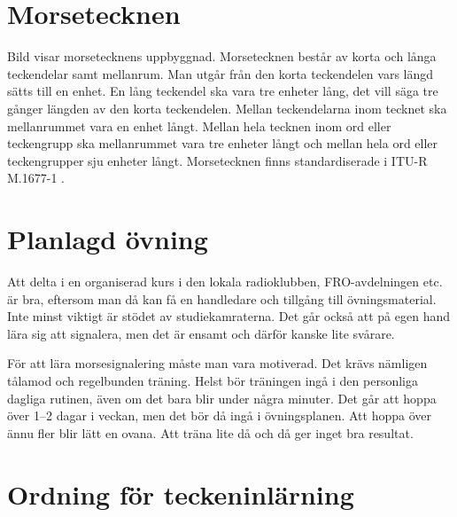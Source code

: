 \section{Morsetecknen}


Bild  visar morsetecknens uppbyggnad.
Morsetecknen består av korta och långa teckendelar samt mellanrum.
Man utgår från den korta teckendelen vars längd sätts till en enhet.
En lång teckendel ska vara tre enheter lång, det vill säga tre gånger längden
av den korta teckendelen.
Mellan teckendelarna inom tecknet ska mellanrummet vara en enhet långt.
Mellan hela tecknen inom ord eller teckengrupp ska mellanrummet vara
tre enheter långt och mellan hela ord eller teckengrupper sju enheter långt.
Morsetecknen finns standardiserade i ITU-R M.1677-1 \cite{M1677-1}.

\section{Planlagd övning}

Att delta i en organiserad kurs i den lokala radioklubben, FRO-avdelningen etc.
är bra, eftersom man då kan få en handledare och tillgång till övningsmaterial.
Inte minst viktigt är stödet av studiekamraterna.
Det går också att på egen hand lära sig att signalera, men det är ensamt och
därför kanske lite svårare.

För att lära morsesignalering måste man vara motiverad.
Det krävs nämligen tålamod och regelbunden träning.
Helst bör träningen ingå i den personliga dagliga rutinen, även om det bara
blir under några minuter.
Det går att hoppa över 1--2 dagar i veckan, men det bör då ingå i övningsplanen.
Att hoppa över ännu fler blir lätt en ovana.
Att träna lite då och då ger inget bra resultat.

\section[Inlärningsordning]{Ordning för teckeninlärning}

